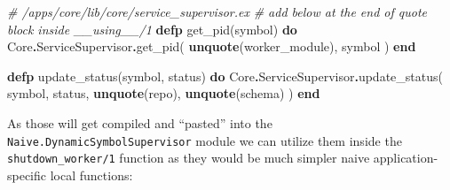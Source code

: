\documentclass[
  oneside]{book}
\newenvironment{Shaded}{\begin{snugshade}}{\end{snugshade}}
\newcommand{\CommentTok}[1]{\textcolor[rgb]{0.56,0.35,0.01}{\textit{#1}}}
\newcommand{\ConstantTok}[1]{\textcolor[rgb]{0.00,0.00,0.00}{#1}}
\newcommand{\KeywordTok}[1]{\textcolor[rgb]{0.13,0.29,0.53}{\textbf{#1}}}
\newcommand{\NormalTok}[1]{#1}
\newcommand{\OperatorTok}[1]{\textcolor[rgb]{0.81,0.36,0.00}{\textbf{#1}}}
\begin{document}
\begin{Shaded}
\begin{Highlighting}[]
      \CommentTok{\# /apps/core/lib/core/service\_supervisor.ex}
      \CommentTok{\# add below at the end of \textasciigrave{}quote\textasciigrave{} block inside \textasciigrave{}\_\_using\_\_/1\textasciigrave{}}
      \KeywordTok{defp}\NormalTok{ get\_pid(symbol) }\KeywordTok{do}
        \ConstantTok{Core}\OperatorTok{.}\ConstantTok{ServiceSupervisor}\OperatorTok{.}\NormalTok{get\_pid(}
          \KeywordTok{unquote}\NormalTok{(worker\_module),}
\NormalTok{          symbol}
\NormalTok{        )}
      \KeywordTok{end}

      \KeywordTok{defp}\NormalTok{ update\_status(symbol, status) }\KeywordTok{do}
        \ConstantTok{Core}\OperatorTok{.}\ConstantTok{ServiceSupervisor}\OperatorTok{.}\NormalTok{update\_status(}
\NormalTok{          symbol,}
\NormalTok{          status,}
          \KeywordTok{unquote}\NormalTok{(repo),}
          \KeywordTok{unquote}\NormalTok{(schema)}
\NormalTok{        )}
      \KeywordTok{end}
\end{Highlighting}
\end{Shaded}

As those will get compiled and ``pasted'' into the \texttt{Naive.DynamicSymbolSupervisor} module we can utilize them inside the \texttt{shutdown\_worker/1} function as they would be much simpler naive application-specific local functions:
\end{document}
